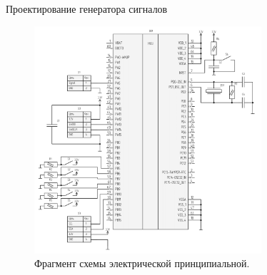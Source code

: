 \documentclass[10pt]{beamer}
\begin{document}
\begin{frame}{Проектирование генератора сигналов}
  \begin{figure}
  \includegraphics[width=0.75\textwidth]{scheme-cropped}
  \caption*{Фрагмент схемы электрической принципиальной.}
  \end{figure}
\end{frame}
\end{document}
